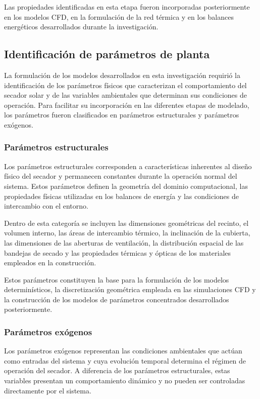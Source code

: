 Las propiedades identificadas en esta etapa fueron incorporadas posteriormente en los modelos CFD, en la formulación de la red térmica y en los balances energéticos desarrollados durante la investigación.

\subsection{Identificación de parámetros de planta}

La formulación de los modelos desarrollados en esta investigación requirió la identificación de los parámetros físicos que caracterizan el comportamiento del secador solar y de las variables ambientales que determinan sus condiciones de operación. Para facilitar su incorporación en las diferentes etapas de modelado, los parámetros fueron clasificados en parámetros estructurales y parámetros exógenos.

\subsubsection{Parámetros estructurales}

Los parámetros estructurales corresponden a características inherentes al diseño físico del secador y permanecen constantes durante la operación normal del sistema. Estos parámetros definen la geometría del dominio computacional, las propiedades físicas utilizadas en los balances de energía y las condiciones de intercambio con el entorno.

Dentro de esta categoría se incluyen las dimensiones geométricas del recinto, el volumen interno, las áreas de intercambio térmico, la inclinación de la cubierta, las dimensiones de las aberturas de ventilación, la distribución espacial de las bandejas de secado y las propiedades térmicas y ópticas de los materiales empleados en la construcción.

Estos parámetros constituyen la base para la formulación de los modelos determinísticos, la discretización geométrica empleada en las simulaciones CFD y la construcción de los modelos de parámetros concentrados desarrollados posteriormente.


\subsubsection{Parámetros exógenos}

Los parámetros exógenos representan las condiciones ambientales que actúan como entradas del sistema y cuya evolución temporal determina el régimen de operación del secador. A diferencia de los parámetros estructurales, estas variables presentan un comportamiento dinámico y no pueden ser controladas directamente por el sistema.


